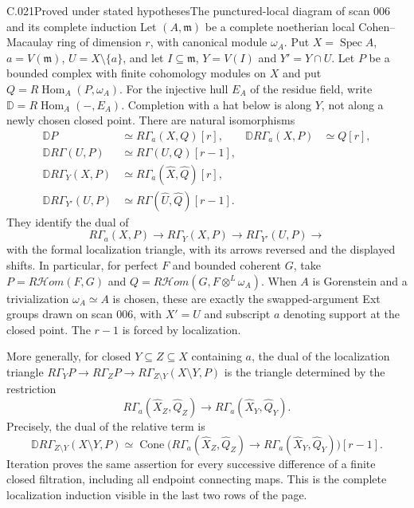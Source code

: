 \begin{saresult}{C.021}{Proved under stated hypotheses}{The punctured-local diagram of scan 006 and its complete induction}
Let $(A,\mathfrak m)$ be a complete noetherian local Cohen--Macaulay
ring of dimension $r$, with canonical module $\omega_A$.
Put $X=\operatorname{Spec}A$, $a=V(\mathfrak m)$,
$U=X\setminus\{a\}$, and let $I\subseteq\mathfrak m$,
$Y=V(I)$ and $Y'=Y\cap U$. Let $P$ be a bounded complex with
finite cohomology modules on $X$ and
put $Q=R\operatorname{Hom}_A(P,\omega_A)$.
For the injective hull $E_A$ of the residue field, write
$\mathbb D=R\operatorname{Hom}_A(-,E_A)$.
Completion with a hat below is along $Y$, not along a newly chosen
closed point. There are natural isomorphisms
\begin{align}
 \mathbb D P&\simeq R\Gamma_a(X,Q)[r],&
 \mathbb D R\Gamma_a(X,P)&\simeq Q[r],\tag{C.21.1}\\
 \mathbb D R\Gamma(U,P)&\simeq R\Gamma(U,Q)[r-1],\tag{C.21.2}\\
 \mathbb D R\Gamma_Y(X,P)&\simeq
 R\Gamma_a(\widehat X,\widehat Q)[r],\tag{C.21.3}\\
 \mathbb D R\Gamma_{Y'}(U,P)&\simeq
 R\Gamma(\widehat U,\widehat Q)[r-1].\tag{C.21.4}
\end{align}
They identify the dual of
\[
 R\Gamma_a(X,P)\longrightarrow R\Gamma_Y(X,P)
 \longrightarrow R\Gamma_{Y'}(U,P)\longrightarrow
 \tag{C.21.5}
\]
with the formal localization triangle, with its arrows reversed
and the displayed shifts. In particular, for perfect $F$ and
bounded coherent $G$, take
$P=R\mathcal Hom(F,G)$ and
$Q=R\mathcal Hom(G,F\otimes^L\omega_A)$.
When $A$ is Gorenstein and a trivialization $\omega_A\simeq A$ is
chosen, these are exactly the swapped-argument Ext groups drawn on
scan 006, with $X'=U$ and subscript $a$ denoting support at the
closed point. The $r-1$ is forced by localization.

More generally, for closed $Y\subseteq Z\subseteq X$ containing
$a$, the dual of the localization triangle
$R\Gamma_Y P\to R\Gamma_Z P\to
R\Gamma_{Z\setminus Y}(X\setminus Y,P)$ is the triangle determined
by the restriction
\[
 R\Gamma_a(\widehat X_Z,\widehat Q_Z)
 \longrightarrow R\Gamma_a(\widehat X_Y,\widehat Q_Y).
 \tag{C.21.6}
\]
Precisely, the dual of the relative term is
\[
 \mathbb D R\Gamma_{Z\setminus Y}(X\setminus Y,P)
 \simeq \operatorname{Cone}\bigl(
 R\Gamma_a(\widehat X_Z,\widehat Q_Z)\to
 R\Gamma_a(\widehat X_Y,\widehat Q_Y)\bigr)[r-1].
\]
Iteration proves the same assertion for every successive difference
of a finite closed filtration, including all endpoint connecting
maps. This is the complete localization induction visible in the
last two rows of the page.
\end{saresult}

